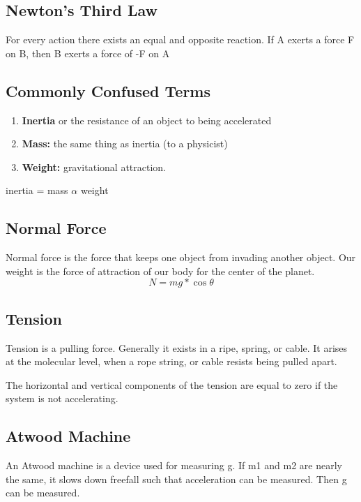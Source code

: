 \subsection{Newton's Third Law}
For every action there exists an equal and opposite reaction. If A exerts a force F on B, then B exerts a force of -F on A

\subsection{Commonly Confused Terms}
\begin{enumerate}
	\item \textbf{Inertia} or the resistance of an object to being accelerated
	\item \textbf{Mass:} the same thing as inertia (to a physicist)
	\item \textbf{Weight:} gravitational attraction.
\end{enumerate}
\begin{center}
	inertia = mass $\alpha$ weight
\end{center}

\subsection{Normal Force}
Normal force is the force that keeps one object from invading another object. Our weight is the force of attraction of our body for the center of the planet.
\[N=mg*\cos\theta\]

\subsection{Tension}
Tension is a pulling force. Generally it exists in a ripe, spring, or cable. It arises at the molecular level, when a rope string, or cable resists being pulled apart.

The horizontal and vertical components of the tension are equal to zero if the system is not accelerating. 

\subsection{Atwood Machine}
An Atwood machine is a device used for measuring g. If m1 and m2 are nearly the same, it slows down freefall such that acceleration can be measured. Then g can be measured. 